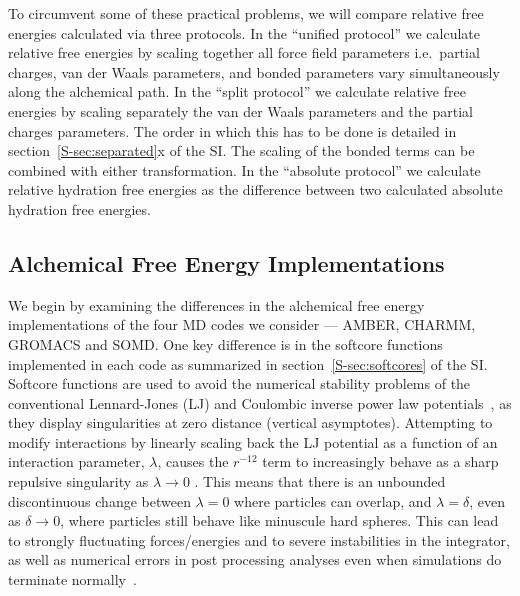 \documentclass[journal=jctcce,manuscript=article]{achemso}
\begin{document}
To circumvent some of these practical problems, we will compare
relative free energies calculated via three protocols.  In the
``unified protocol'' we calculate relative free energies by scaling
together all force field parameters i.e.\ partial charges, van der
Waals parameters, and bonded parameters vary simultaneously along the
alchemical path.  In the ``split protocol'' we calculate relative free
energies by scaling separately the van der Waals parameters and the
partial charges parameters.  The order in which this has to be done is
detailed in section~\ref{S-sec:separated}x of the SI.  The scaling of
the bonded terms can be combined with either transformation.  In the
``absolute protocol'' we calculate relative hydration free energies as
the difference between two calculated absolute hydration free energies.

\subsection{Alchemical Free Energy Implementations}
\label{sec:afe_impl}

We begin by examining the differences in the alchemical free energy
implementations of the four MD codes we consider --- AMBER, CHARMM, GROMACS and
SOMD.  One key difference is in the softcore
functions implemented in each code as summarized in section~\ref{S-sec:softcores} of the
SI. ~\cite{beutler_avoiding_1994,zacharias_separationshifted_1994} Softcore functions are used to avoid the numerical
stability problems of the conventional Lennard-Jones (LJ) and Coulombic inverse power law
potentials~\cite{ISI:A1993MB07100015,steinbrecher_nonlinear_2007}, as they display singularities at
zero distance (vertical asymptotes).  Attempting to modify interactions by
linearly scaling back the LJ potential as a function of an
interaction parameter, $\lambda$, causes the $r^{-12}$ term to increasingly behave
as a sharp repulsive singularity as $\lambda\rightarrow 0$ \cite{ISI:A1993MB07100015}.  This means that there
is an unbounded discontinuous change between $\lambda = 0$ where particles can overlap,
and $\lambda = \delta$, even as $\delta \rightarrow 0$, where particles still
behave like minuscule hard spheres.  This can lead to strongly
fluctuating forces/energies and to severe instabilities in the integrator, as
well as numerical errors in post processing analyses even when simulations do
terminate normally~\cite{beutler_avoiding_1994,
zacharias_separationshifted_1994, steinbrecher_nonlinear_2007}.
\end{document}
